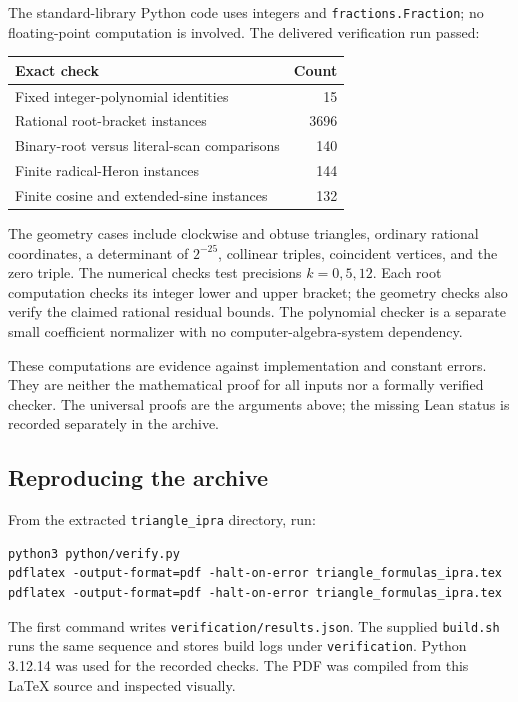 \documentclass[11pt,a4paper]{article}
\theoremstyle{definition}
\newcommand{\code}[1]{\texttt{\small #1}}
\numberwithin{equation}{section}
\begin{document}
The standard-library Python code uses integers and
\code{fractions.Fraction}; no floating-point computation is involved.
The delivered verification run passed:
\begin{center}
\begin{tabular}{@{}lr@{}}
\toprule
Exact check & Count\\
\midrule
Fixed integer-polynomial identities & 15\\
Rational root-bracket instances & 3696\\
Binary-root versus literal-scan comparisons & 140\\
Finite radical-Heron instances & 144\\
Finite cosine and extended-sine instances & 132\\
\bottomrule
\end{tabular}
\end{center}

The geometry cases include clockwise and obtuse triangles,
ordinary rational coordinates, a determinant of \(2^{-25}\),
collinear triples, coincident vertices, and the zero triple.
The numerical checks test precisions \(k=0,5,12\).
Each root computation checks its integer lower and upper bracket;
the geometry checks also verify the claimed rational residual
bounds. The polynomial checker is a separate small coefficient
normalizer with no computer-algebra-system dependency.

These computations are evidence against implementation and
constant errors. They are neither the mathematical proof for all
inputs nor a formally verified checker. The universal proofs are
the arguments above; the missing Lean status is recorded
separately in the archive.

\subsection{Reproducing the archive}

From the extracted \code{triangle\_ipra} directory, run:
\begin{verbatim}
python3 python/verify.py
pdflatex -output-format=pdf -halt-on-error triangle_formulas_ipra.tex
pdflatex -output-format=pdf -halt-on-error triangle_formulas_ipra.tex
\end{verbatim}
The first command writes \code{verification/results.json}.
The supplied \code{build.sh} runs the same sequence and stores
build logs under \code{verification}. Python 3.12.14 was used
for the recorded checks. The PDF was compiled from this
LaTeX source and inspected visually.
\end{document}
